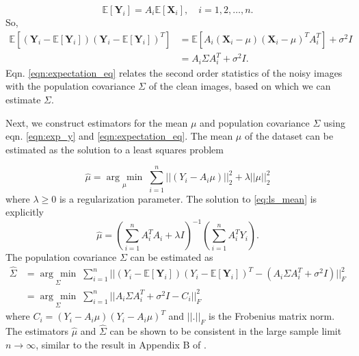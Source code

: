 \documentclass[review]{elsarticle}
\newcommand{\argmin}[1]{\underset{#1}{\operatorname{arg}\,\operatorname{min}}\;}
\begin{document}
\begin{equation}
\mathbb{E}[\textbf{Y}_i]=A_i \mathbb{E}[\textbf{X}_i], \quad i=1,2,\ldots,n.
\label{eqn:exp_y}
\end{equation}
So,
\begin{equation}
\begin{aligned}
\mathbb{E}[(\textbf{Y}_i-\mathbb{E}[\textbf{Y}_i])(\textbf{Y}_i-\mathbb{E}[\textbf{Y}_i])^T] 
&= \mathbb{E} [A_i(\textbf{X}_i-\mu)(\textbf{X}_i-\mu)^T A_i^T] + \sigma^2I \\
&=  A_i \Sigma A_i^T + \sigma^2I .
\end{aligned}
\label{eqn:expectation_eq}
\end{equation}
Eqn. \ref{eqn:expectation_eq} relates the second order statistics of the noisy images with the 
population covariance $\Sigma$ of the clean images, based on which we can 
estimate $\Sigma$.

Next, we construct estimators for the mean $\mu$ and population covariance 
$\Sigma$ using eqn. \ref{eqn:exp_y} and \ref{eqn:expectation_eq}.
The mean $\mu$ of the dataset can be estimated 
as the solution to
a least squares problem

\begin{equation}
 \hat\mu = \argmin{\mu} \sum_{i=1}^n||(Y_i-A_i\mu)||_2^2 + 
\lambda||\mu||_2^2
\label{eq:ls_mean}
\end{equation}
where $\lambda \geq 0$ is a regularization parameter. The solution to 
\ref{eq:ls_mean} is explicitly
\begin{equation}
 \hat\mu = (\sum_{i=1}^n A_i^T A_i + \lambda I)^{-1}(\sum_{i=1}^n 
A_i^T Y_i).
\label{eq:ls_mean_sol}
\end{equation}
The population covariance $\Sigma$ can be estimated as 
\begin{equation}
\begin{aligned}
\hat\Sigma 
&= \argmin{\Sigma} \sum_{i=1}^n || (Y_i - \mathbb{E}[\textbf{Y}_i]) (Y_i - \mathbb{E}[\textbf{Y}_i])^T
- (A_i \Sigma A_i^T + \sigma^2 I)||_F^2 \\
&= \argmin{\Sigma} \sum_{i=1}^n || A_i\Sigma A_i^T + \sigma^2 I - C_i  ||_F^2 
\end{aligned}
\label{eqn:ls1}
\end{equation}
where $C_i=(Y_i - A_i \mu) (Y_i - A_i \mu)^T$ and $||.||_F$ is the Frobenius matrix norm. 
The estimators $\hat \mu$ and $\hat \Sigma$ can be shown to be consistent in the large sample limit
$n \to \infty$, similar to the result in Appendix B of \cite{gene}. 
\end{document}
